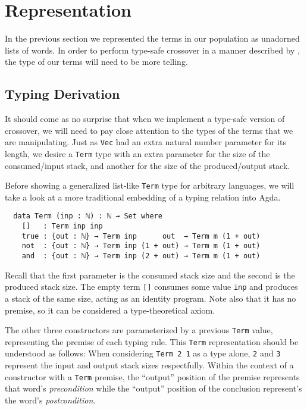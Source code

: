 \documentclass[runningheads,a4paper]{llncs}
\begin{document}
\section{Representation}

In the previous section we represented the terms in our population as
unadorned lists of words. In order to perform type-safe crossover in
a manner described by \cite{tchernev:forthcross}, the type of our
terms will need to be more telling.

\subsection{Typing Derivation}

It should come as no surprise that when we implement a type-safe
version of crossover, we will need to pay close attention to the
types of the terms that we are manipulating. Just as \texttt{Vec} had an extra
natural number parameter for its length, we desire a \texttt{Term}
type with an extra parameter for the size of the consumed/input stack, and
another for the size of the produced/output stack.

Before showing a generalized list-like \texttt{Term} type for arbitrary
languages, we will take a look at a more traditional embedding of a
typing relation into Agda.

\begin{verbatim}
  data Term (inp : ℕ) : ℕ → Set where
    []   : Term inp inp
    true : {out : ℕ} → Term inp      out  → Term m (1 + out)
    not  : {out : ℕ} → Term inp (1 + out) → Term m (1 + out)
    and  : {out : ℕ} → Term inp (2 + out) → Term m (1 + out)
\end{verbatim}

Recall that the first parameter is the consumed stack size and the second
is the produced stack size. The empty term \texttt{[]} consumes
some value \texttt{inp} and produces a stack of the same size, acting as
an identity program. Note also that it has no premise, so it can be
considered a type-theoretical axiom.

The other three constructors are parameterized by a previous
\texttt{Term} value, representing the premise of each typing rule.
This \texttt{Term} representation should be understood as
follows: When considering \texttt{Term 2 1} as a type alone,
\texttt{2} and \texttt{3} represent the input and output stack sizes
respectfully. Within the context of a constructor with a \texttt{Term}
premise, the ``output'' position of the premise represents that word's
\textit{precondition} while the ``output'' position of the conclusion
represent's the word's \textit{postcondition}.
\end{document}
